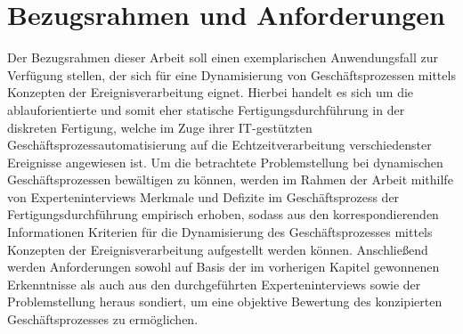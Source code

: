 \chapter{Bezugsrahmen und Anforderungen}
Der Bezugsrahmen dieser Arbeit soll einen exemplarischen Anwendungsfall zur Verfügung stellen, der sich für eine Dynamisierung von Geschäftsprozessen mittels Konzepten der Ereignisverarbeitung eignet. Hierbei handelt es sich um die ablauforientierte und somit eher statische Fertigungsdurchführung in der diskreten Fertigung, welche im Zuge ihrer \ac{IT}-gestützten Geschäftsprozessautomatisierung auf die Echtzeitverarbeitung verschiedenster Ereignisse angewiesen ist. Um die betrachtete Problemstellung bei dynamischen Geschäftsprozessen bewältigen zu können, werden im Rahmen der Arbeit mithilfe von Experteninterviews Merkmale und Defizite im Geschäftsprozess der Fertigungsdurchführung empirisch erhoben, sodass aus den korrespondierenden Informationen Kriterien für die Dynamisierung des Geschäftsprozesses mittels Konzepten der Ereignisverarbeitung aufgestellt werden können. Anschließend werden Anforderungen sowohl auf Basis der im vorherigen Kapitel gewonnenen Erkenntnisse als auch aus den durchgeführten Experteninterviews sowie der Problemstellung heraus sondiert, um eine objektive Bewertung des konzipierten Geschäftsprozesses zu ermöglichen.


